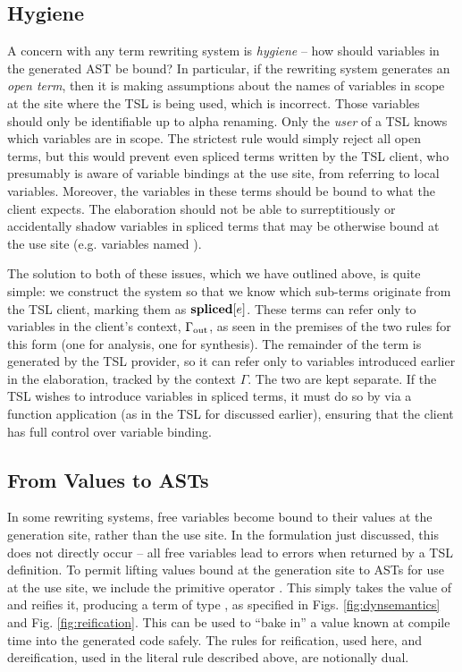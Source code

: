 \subsection{Hygiene}


A concern with any term rewriting system is \emph{hygiene} -- how should variables in the generated AST be bound? In particular, if the rewriting system generates an \emph{open term}, then it is making assumptions about the names of variables in scope at the site where the TSL is being used, which is incorrect. Those variables should only be identifiable up to alpha renaming. Only the \emph{user} of a TSL knows which variables are in scope. The strictest rule would simply reject all open terms, but this would prevent even spliced terms written by the TSL client, who presumably is aware of variable bindings at the use site, from referring to local variables. Moreover, the variables in these terms should be bound to what the client expects. The elaboration should not be able to surreptitiously or accidentally shadow variables in spliced terms that {may} be otherwise bound at the use site (e.g. variables named ).

The solution to both of these issues, which we have outlined above, is quite simple: we construct the system so that we know which sub-terms originate from the TSL client, marking them as $\textbf{spliced}[e]$. These terms can refer only to variables in the client's context, $\Gamma_{\text{out}}$, as seen in the premises of the two rules for this form (one for analysis, one for synthesis). The remainder of the term is generated by the TSL provider, so it can refer only to variables introduced earlier in the elaboration, tracked by the context $\Gamma$. The two are kept separate. If the TSL wishes to introduce variables in spliced terms, it must do so by via a function application (as in the TSL for  discussed earlier), ensuring that the client has full control over variable binding.

\subsection{From Values to ASTs}
In some rewriting systems, free variables become bound to their values at the generation site, rather than the use site. In the formulation just discussed, this does not directly occur -- all free variables lead to errors when returned by a TSL definition. To permit lifting values bound at the generation site to ASTs for use at the use site, we include the primitive operator . This simply takes the value of  and reifies it, producing a term of type , as specified in Figs. \ref{fig:dynsemantics} and Fig. \ref{fig:reification}. This can be used to ``bake in'' a value known at compile time into the generated code safely. The rules for reification, used here, and dereification, used in the literal rule described above, are notionally dual.

